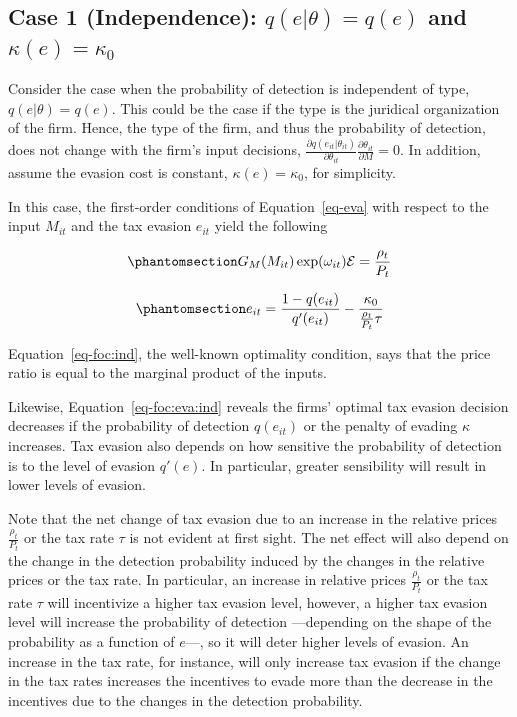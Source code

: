 \documentclass[
  12pt]{article}
\theoremstyle{definition}
\theoremstyle{remark}
\begin{document}
\subsection{\texorpdfstring{Case 1 (Independence): \(q(e|\theta)=q(e)\)
and
\(\kappa(e)=\kappa_0\)}{Case 1 (Independence): q(e\textbar\textbackslash theta)=q(e) and \textbackslash kappa(e)=\textbackslash kappa\_0}}\label{case-1-independence-qethetaqe-and-kappaekappa_0}

Consider the case when the probability of detection is independent of
type, \(q(e|\theta)=q(e)\). This could be the case if the type is the
juridical organization of the firm. Hence, the type of the firm, and
thus the probability of detection, does not change with the firm's input
decisions,
\(\frac{\partial q(e_{it}|\theta_{it})}{\partial \theta_{it}}\frac{\partial \theta_{it}}{\partial M}=0\).
In addition, assume the evasion cost is constant,
\(\kappa(e)=\kappa_0\), for simplicity.

In this case, the first-order conditions of Equation~\ref{eq-eva} with
respect to the input \(M_{it}\) and the tax evasion \(e_{it}\) yield the
following

\begin{equation}\phantomsection\label{eq-foc:ind}{
G_M(M_{it})\exp(\omega_{it})\mathcal{E}=\frac{\rho_{t}}{P_t}
}\end{equation}

\begin{equation}\phantomsection\label{eq-foc:eva:ind}{
e_{it}=\frac{1-q(e_{it})}{q'(e_{it})}-\frac{\kappa_0}{\frac{\rho_{t}}{P_t}\tau}
}\end{equation}

Equation~\ref{eq-foc:ind}, the well-known optimality condition, says
that the price ratio is equal to the marginal product of the inputs.

Likewise, Equation~\ref{eq-foc:eva:ind} reveals the firms' optimal tax
evasion decision decreases if the probability of detection \(q(e_{it})\)
or the penalty of evading \(\kappa\) increases. Tax evasion also depends
on how sensitive the probability of detection is to the level of evasion
\(q'(e)\). In particular, greater sensibility will result in lower
levels of evasion.

Note that the net change of tax evasion due to an increase in the
relative prices \(\frac{\rho_{t}}{P_t}\) or the tax rate \(\tau\) is not
evident at first sight. The net effect will also depend on the change in
the detection probability induced by the changes in the relative prices
or the tax rate. In particular, an increase in relative prices
\(\frac{\rho_{t}}{P_t}\) or the tax rate \(\tau\) will incentivize a
higher tax evasion level, however, a higher tax evasion level will
increase the probability of detection ---depending on the shape of the
probability as a function of \(e\)---, so it will deter higher levels of
evasion. An increase in the tax rate, for instance, will only increase
tax evasion if the change in the tax rates increases the incentives to
evade more than the decrease in the incentives due to the changes in the
detection probability.
\end{document}
